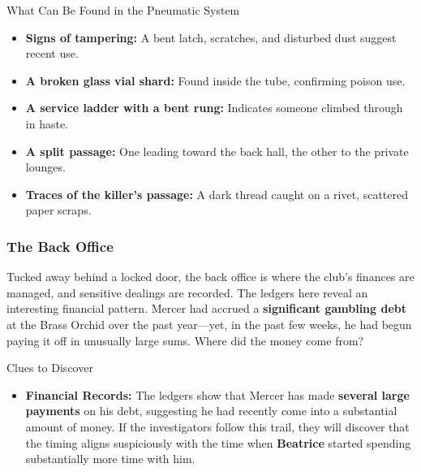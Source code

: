 \begin{WyrdComment}{What Can Be Found in the Pneumatic System}  
	\begin{itemize}
		\item \textbf{Signs of tampering:} A bent latch, scratches, and disturbed dust suggest recent use.
		\item \textbf{A broken glass vial shard:} Found inside the tube, confirming poison use.
		\item \textbf{A service ladder with a bent rung:} Indicates someone climbed through in haste.
		\item \textbf{A split passage:} One leading toward the back hall, the other to the private lounges.
		\item \textbf{Traces of the killer’s passage:} A dark thread caught on a rivet, scattered paper scraps.
	\end{itemize}
\end{WyrdComment}

\subsubsection{The Back Office}  
Tucked away behind a locked door, the back office is where the club’s finances are managed, and sensitive dealings are recorded. The ledgers here reveal an interesting financial pattern. Mercer had accrued a \textbf{significant gambling debt} at the Brass Orchid over the past year—yet, in the past few weeks, he had begun paying it off in unusually large sums. Where did the money come from?  

\begin{WyrdComment}{Clues to Discover}  
	\begin{itemize}  
		\item \textbf{Financial Records:} The ledgers show that Mercer has made \textbf{several large payments} on his debt, suggesting he had recently come into a substantial amount of money. If the investigators follow this trail, they will discover that the timing aligns suspiciously with the time when \textbf{Beatrice} started spending substantially more time with him.  
	\end{itemize}  
\end{WyrdComment}  





